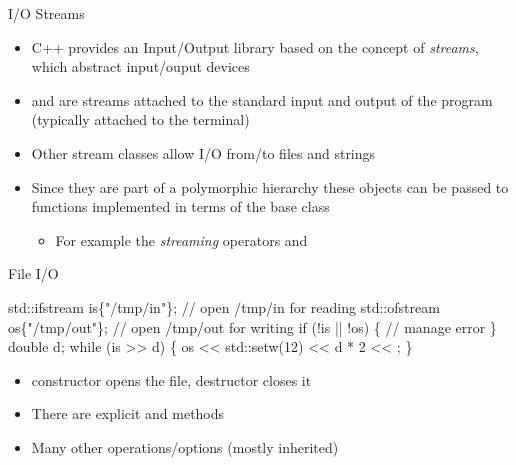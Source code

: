 \begin{frame}{I/O Streams}

  \begin{itemize}
  \item C++ provides an Input/Output library based on the concept of \textit{streams}, which abstract input/ouput devices
  \item {} and  are streams attached to the
    standard input and output of the program (typically attached to the
    terminal)
  \item Other stream classes allow I/O from/to files and strings
  \item Since they are part of a polymorphic hierarchy these objects can be
    passed to functions implemented in terms of the base class
    \begin{itemize}
    \item For example the \textit{streaming} operators \code{<<} and \code{>>}
    \end{itemize}
  \end{itemize}
\end{frame}

\begin{frame}[fragile]{File I/O}

  \begin{codeblock}
std::ifstream is\{"/tmp/in"\};  // open /tmp/in for reading
std::ofstream os\{"/tmp/out"\}; // open /tmp/out for writing
if (!is || !os) \{
  // manage error
\}
double d;
while (is \alert{>>} d) \{
  os \alert{<<} std::setw(12) \alert{<<} d * 2 \alert{<<} \bslashn{};
\}\end{codeblock}

  \begin{itemize}
  \item {} constructor opens the file, destructor closes it
  \item There are explicit  and  methods
  \item Many other operations/options (mostly inherited)
  \end{itemize}

\end{frame}

